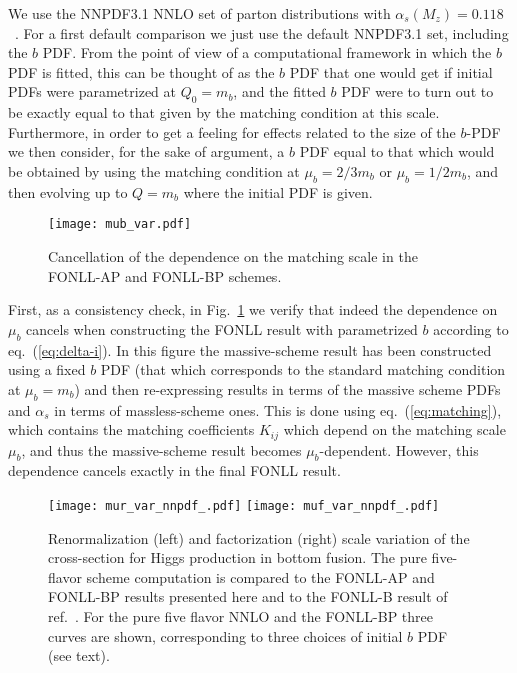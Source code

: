 We use the  NNPDF3.1 NNLO set of parton distributions with
$\alpha_s(M_z)=0.118$~\cite{Ball:2017nwa}. For a first default
comparison we just use the default NNPDF3.1 set, including the $b$
PDF. From the point of view of a computational framework in which the
$b$ PDF is fitted,
this can be thought of as the $b$ PDF that one would get if initial
PDFs were parametrized at $Q_0=m_b$, and the fitted $b$ PDF were to
turn out to be exactly equal to that given by the matching condition
at this scale. Furthermore, in order
to get a feeling for effects related to the size of
the $b$-PDF we then consider, for the sake of argument, a $b$ PDF
equal to that which would be obtained by using the matching condition
at $\mu_b = 2/3 m_b$ or $\mu_b = 1/2 m_b$, and then evolving up to
$Q=m_b$ where the initial PDF is given.

\begin{figure}[htbp]
  \centering
  \texttt{[image: mub\_var.pdf]}
  \caption{Cancellation of the dependence on the matching scale in the
  FONLL-AP and FONLL-BP schemes.}
  \label{fig:mub-var}
\end{figure}
First, as a consistency check, in Fig.~\ref{fig:mub-var} we verify that
indeed the dependence on $\mu_b$ cancels when constructing the FONLL
result with parametrized $b$ according to eq.~(\ref{eq:delta-i}). In
this figure the massive-scheme result has been constructed using a
fixed  $b$ PDF (that which corresponds to the standard matching
condition at $\mu_b=m_b$) and then re-expressing results in terms of
the massive scheme PDFs  and $\alpha_s$ in terms of massless-scheme
ones. This is done using eq.~(\ref{eq:matching}), which contains the
matching coefficients $K_{ij}$ which depend on the matching scale
$\mu_b$, and thus the massive-scheme result becomes
$\mu_b$-dependent.
However, this dependence cancels exactly in the final
FONLL result.

\begin{figure}[htbp]
  \centering
  \texttt{[image: mur\_var\_nnpdf\_.pdf]}
  \texttt{[image: muf\_var\_nnpdf\_.pdf]}
  \caption{Renormalization (left) and factorization (right) scale
    variation of the cross-section for Higgs production in bottom
    fusion. The pure five-flavor scheme computation is compared to the
  FONLL-AP and FONLL-BP results presented here and to the FONLL-B
  result of ref.~\cite{Forte:2015hba}. For the pure five flavor
  NNLO and the  FONLL-BP three curves are shown, corresponding to 
  three choices of initial $b$ PDF (see text).
  }
  \label{fig:scale-var}
\end{figure}


